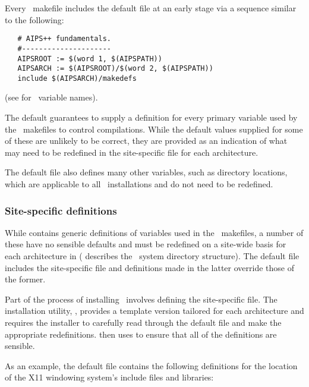 Every \aipspp\ makefile includes the default  file at an early
stage via a sequence similar to the following:

\begin{verbatim}
   # AIPS++ fundamentals.
   #---------------------
   AIPSROOT := $(word 1, $(AIPSPATH))
   AIPSARCH := $(AIPSROOT)/$(word 2, $(AIPSPATH))
   include $(AIPSARCH)/makedefs
\end{verbatim}

\noindent
(see  for \aipspp\ variable names).

The default  guarantees to supply a definition for every
primary variable used by the \aipspp\ makefiles to control compilations.
While the default values supplied for some of these are unlikely to be
correct, they are provided as an indication of what may need to be redefined
in the site-specific  file for each architecture.

The default  file also defines many other variables, such as
directory locations, which are applicable to all \aipspp\ installations
and do not need to be redefined.

\subsubsection*{Site-specific definitions}

While  contains generic definitions of variables used
in the \aipspp\ makefiles, a number of these have no sensible defaults and
must be redefined on a site-wide basis for each architecture in
 ( describes the \aipspp\ 
system directory structure).  The default file includes the site-specific file
and definitions made in the latter override those of the former.

Part of the process of installing \aipspp\ involves defining the site-specific
\filref{makedefs} file.  The installation utility, \exeref{configure},
provides a template version tailored for each architecture and requires the
installer to carefully read through the default \file{makedefs} file and make
the appropriate redefinitions.  \aipsexe{configure} then uses 
to ensure that all of the definitions are sensible.

As an example, the default  file contains the following
definitions for the location of the \textsc{X11} windowing system's include
files and libraries:

